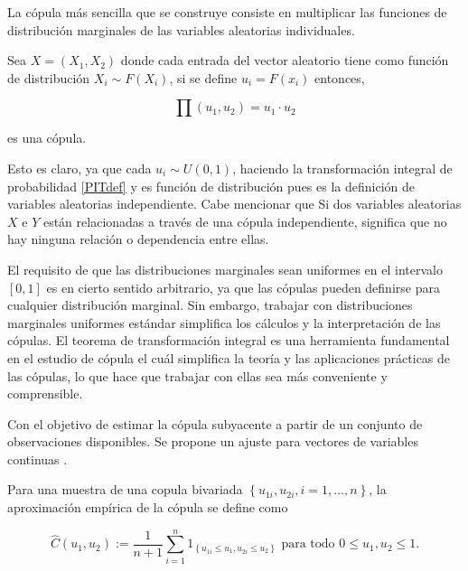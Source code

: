 \begin{ejemplo}
    La cópula más sencilla que se construye consiste en multiplicar las funciones de distribución marginales de las variables aleatorias individuales.

    Sea $X = (X_1, X_2)$ donde cada entrada del vector aleatorio tiene como función de distribución $X_i \sim F(X_i)$, si se define $u_i = F(x_i)$ entonces,

    \begin{equation}
         \prod (u_1, u_2) = u_1 \cdot u_2
    \end{equation}

    es una cópula.

    Esto es claro, ya que cada $u_i \sim U(0, 1)$, haciendo la transformación integral de probabilidad \ref{PITdef} y es función de distribución pues es la definición de variables aleatorias independiente. Cabe mencionar que Si dos variables aleatorias $X$ e $Y$ están relacionadas a través de una cópula independiente, significa que no hay ninguna relación o dependencia entre ellas.
\end{ejemplo}

El requisito de que las distribuciones marginales sean uniformes en el intervalo $[0,1]$ es en cierto sentido arbitrario, ya que las cópulas pueden definirse para cualquier distribución marginal. Sin embargo, trabajar con distribuciones marginales uniformes estándar simplifica los cálculos y la interpretación de las cópulas. El teorema de transformación integral es una herramienta fundamental en el estudio de cópula el cuál simplifica la teoría y las aplicaciones prácticas de las cópulas, lo que hace que trabajar con ellas sea más conveniente y comprensible. \cite{CopulasR}

Con el objetivo de estimar la cópula subyacente a partir de un conjunto de observaciones disponibles. Se propone un ajuste para vectores de variables continuas \cite{CopulasR}.

\begin{defn}
    Para una muestra de una copula bivariada $\left\{u_{1 i}, u_{2 i}, i=1, \ldots, n\right\}$, la aproximación empírica de la cópula se define como

    \begin{equation}
        \hat{C}\left(u_1, u_2\right):=\frac{1}{n+1} \sum_{i=1}^n 1_{\left\{u_{1 i} \leq u_1, u_{2 i} \leq u_2\right\}} \text { para todo } 0 \leq u_1, u_2 \leq 1.
    \end{equation}
\end{defn}

